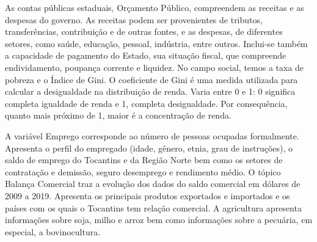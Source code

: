 \begin{center}
{		\par As contas públicas estaduais, Orçamento Público, compreendem as receitas e as despesas do governo. As receitas podem ser provenientes de tributos, transferências, contribuição e de outras fontes, e as despesas, de diferentes setores, como saúde, educação, pessoal, indústria, entre outros. Inclui-se também a capacidade de pagamento do Estado, sua situação fiscal, que compreende endividamento, poupança corrente e liquidez. No campo social, temos a taxa de pobreza e o Índice de Gini. O coeficiente de Gini é uma medida utilizada para calcular a desigualdade na distribuição de renda. Varia entre 0 e 1:   0 significa completa igualdade de renda e 1, completa desigualdade. Por consequência, quanto mais próximo de 1, maior é a concentração de renda.
		\par A variável Emprego corresponde ao número de pessoas ocupadas formalmente. Apresenta o perfil do empregado (idade, gênero, etnia, grau de instruções), o saldo de emprego do Tocantins e da Região Norte bem como os setores de contratação e demissão, seguro desemprego e rendimento médio.
		O tópico Balança Comercial traz a evolução dos dados do saldo comercial em dólares de 2009 a 2019. Apresenta os principais produtos exportados e importados e os países    com os quais    o Tocantins tem relação comercial. A agricultura apresenta informações sobre soja, milho e arroz bem como informações sobre a pecuária, em especial, a bovinocultura.
	}
\end{center}
\thispagestyle{empty}